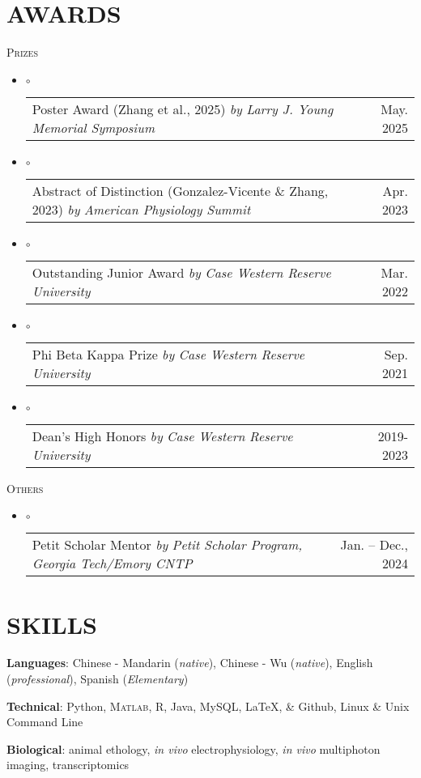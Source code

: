 \documentclass[letterpaper,11pt]{article}
\makeatletter
\newcommand{\resumeSubSection}[1]{%
  {\noindent\color{GlacierBlue}\scshape\large #1 \dotfill} \vspace{-6pt}
}
\newcommand{\resumeAwardItemListStart}{%
    \begin{itemize}[leftmargin=0pt, label={}]\vspace{0pt}
}
\newcommand{\resumeAwardItemListEnd}{%
    \end{itemize}\vspace{6pt}
}
\newcommand{\resumeAwardItem}[3]{%
    \item
    {\color{GlacierBlue}$\circ$} 
    \begin{tabular*}{\dimexpr\linewidth-9pt\relax}[t]{@{\extracolsep{\fill}}l r}
       { {#1} {\small\color{GlacierBlue} \textit{by} }{\small \textit{#2}}} & {\small#3}
    \end{tabular*}\vspace{-8pt}
}
\makeatother
\begin{document}
\section{AWARDS}
	\resumeSubSection{Prizes}
		\resumeAwardItemListStart
			\resumeAwardItem{Poster Award (Zhang et al., 2025)}{Larry J. Young Memorial Symposium}{May. 2025}
			\resumeAwardItem{Abstract of Distinction (Gonzalez-Vicente \& Zhang, 2023)}{American Physiology Summit}{Apr. 2023}
			\resumeAwardItem{Outstanding Junior Award}{Case Western Reserve University}{Mar. 2022}
			\resumeAwardItem{Phi Beta Kappa Prize}{Case Western Reserve University}{Sep. 2021}
			\resumeAwardItem{Dean's High Honors}{Case Western Reserve University}{2019-2023}
		\resumeAwardItemListEnd
	\resumeSubSection{Others}
		\resumeAwardItemListStart
			\resumeAwardItem{Petit Scholar Mentor}{Petit Scholar Program, Georgia Tech/Emory CNTP}{Jan. -- Dec., 2024}
		\resumeAwardItemListEnd
\vspace{-8pt}

\section{SKILLS}
	\textbf{Languages}: Chinese - Mandarin (\textit{native}), Chinese - Wu (\textit{native}), English (\textit{professional}), Spanish (\textit{Elementary})

	\textbf{Technical}: {\color{GlacierBlue}\faPython} Python, {\color{GlacierBlue}\textsc{Matlab}}, {\color{GlacierBlue}\faRProject} R, {\color{GlacierBlue}\faJava} Java, {\color{GlacierBlue}\faDatabase} MySQL, {\color{GlacierBlue}\LaTeX}, {\color{GlacierBlue} \faGitSquare} \& {\color{GlacierBlue} \faGithubSquare} Github, {\color{GlacierBlue} \faLinux} Linux \& Unix Command Line

	\textbf{Biological}: animal ethology, \textit{in vivo} electrophysiology, \textit{in vivo} multiphoton imaging, transcriptomics
\end{document}
